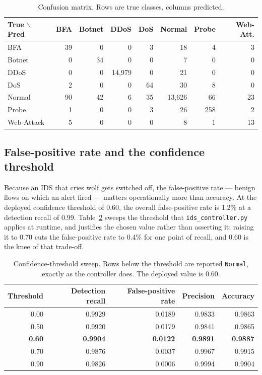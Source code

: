 \documentclass[11pt]{article}
\begin{document}
\begin{table}[h]
\centering
\caption{Confusion matrix. Rows are true classes, columns predicted.}
\label{tab:cm}
\small
\setlength{\tabcolsep}{4pt}
\begin{tabular}{l|rrrrrrr}
\toprule
True $\backslash$ Pred & BFA & Botnet & DDoS & DoS & Normal & Probe & Web-Att. \\
\midrule
BFA        & 39 & 0  & 0      & 3      & 18      & 4     & 3  \\
Botnet     & 0  & 34 & 0      & 0      & 7       & 0     & 0  \\
DDoS       & 0  & 0  & 14{,}979 & 0    & 21      & 0     & 0  \\
DoS        & 2  & 0  & 0      & 64     & 30      & 8     & 0  \\
Normal     & 90 & 42 & 6      & 35     & 13{,}626 & 66   & 23 \\
Probe      & 1  & 0  & 0      & 3      & 26      & 258   & 2  \\
Web-Attack & 5  & 0  & 0      & 0      & 8       & 1     & 13 \\
\bottomrule
\end{tabular}
\end{table}

\subsection{False-positive rate and the confidence threshold}
Because an IDS that cries wolf gets switched off, the false-positive rate --- benign flows
on which an alert fired --- matters operationally more than accuracy. At the deployed
confidence threshold of 0.60, the overall false-positive rate is 1.2\% at a detection
recall of 0.99. Table~\ref{tab:sweep} sweeps the threshold that
\texttt{ids\_controller.py} applies at runtime, and justifies the chosen value rather than
asserting it: raising it to 0.70 cuts the false-positive rate to 0.4\% for one point of
recall, and 0.60 is the knee of that trade-off.

\begin{table}[h]
\centering
\caption{Confidence-threshold sweep. Rows below the threshold are reported \texttt{Normal},
exactly as the controller does. The deployed value is 0.60.}
\label{tab:sweep}
\begin{tabular}{rrrrr}
\toprule
Threshold & Detection recall & False-positive rate & Precision & Accuracy \\
\midrule
0.00 & 0.9929 & 0.0189 & 0.9833 & 0.9863 \\
0.50 & 0.9920 & 0.0179 & 0.9841 & 0.9865 \\
\textbf{0.60} & \textbf{0.9904} & \textbf{0.0122} & \textbf{0.9891} & \textbf{0.9887} \\
0.70 & 0.9876 & 0.0037 & 0.9967 & 0.9915 \\
0.90 & 0.9826 & 0.0006 & 0.9994 & 0.9904 \\
\bottomrule
\end{tabular}
\end{table}
\end{document}
